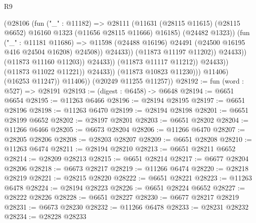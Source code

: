 \begin{lexlean}{R9}
\begin{coremodule}
                                              (@28106
                                                (fun ("_" : @11182) =>
                                                @28111
                                                  (@11631
                                                    (@28115 @11615)
                                                    (@28115 @6652)
                                                    @16160
                                                    @1323
                                                    (@11656 @28115 @11666)
                                                    @16185)
                                                  (@24482 @1323))
                                                (fun ("_" : @11181 @11686) =>
                                                @11598
                                                  (@24488 @16196)
                                                  @24491
                                                  (@24500 @16195 @416 @24504 @16208)
                                                  @24508))
                                              @24433))
                                          (@11873 @11197 @11202))
                                        @24433))
                                    (@11873 @11160 @11203))
                                  @24433))
                              (@11873 @11117 @11212))
                            @24433))
                        (@11873 @11022 @11221))
                      @24433))
                  (@11873 @10823 @11230)))
              @11406)
            (@16253 @11247))
          @11406))
      (@20249 @11255 @11257))
@28192 := fun (word : @527) => @28191
@28193 := (digest : @6458) -> @6648
@28194 := @6651 @6654
@28195 := @11263 @6466
@28196 := @28194 @28195
@28197 := @6651 @28196
@28198 := @11263 @6470
@28199 := @28194 @28198
@28201 := @6651 @28199 @6652
@28202 := @28197 @28201
@28203 := @6651 @28202
@28204 := @11266 @6466
@28205 := @6673 @28204
@28206 := @11266 @6470
@28207 := @28205 @28206
@28208 := @28203 @28207
@28209 := @6651 @28208
@28210 := @11263 @6474
@28211 := @28194 @28210
@28213 := @6651 @28211 @6652
@28214 := @28209 @28213
@28215 := @6651 @28214
@28217 := @6677 @28204 @28206
@28218 := @6673 @28217
@28219 := @11266 @6474
@28220 := @28218 @28219
@28221 := @28215 @28220
@28222 := @6651 @28221
@28223 := @11263 @6478
@28224 := @28194 @28223
@28226 := @6651 @28224 @6652
@28227 := @28222 @28226
@28228 := @6651 @28227
@28230 := @6677 @28217 @28219
@28231 := @6673 @28230
@28232 := @11266 @6478
@28233 := @28231 @28232
@28234 := @28228 @28233

\end{coremodule}
\end{lexlean}
